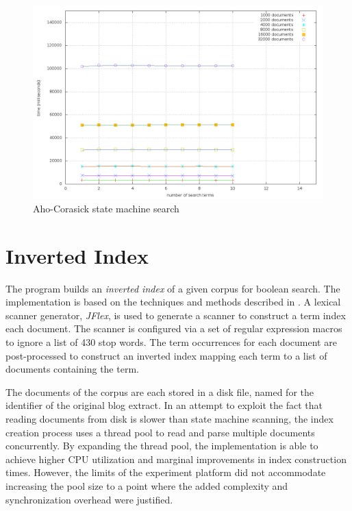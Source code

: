 \documentclass[10pt]{report}
\begin{document}
\begin{figure}
  \begin{center}
	\includegraphics[width=\textwidth,height=!]{ahosearch}
  \end{center}
  \caption{Aho-Corasick state machine search}
  \label{fig:ahosearch}
\end{figure} 

\section{Inverted Index}
The program builds an \textit{inverted index} of a given corpus for
boolean search. The implementation is based on the techniques and
methods described in \cite{RefWorks:109}. A lexical scanner generator,
\textit{JFlex}\cite{RefWorks:112}, is used to generate a scanner to
construct a term index each document. The scanner is configured via a
set of regular expression macros to ignore a list of 430 stop
words. The term occurrences for each document are post-processed to
construct an inverted index mapping each term to a list of documents
containing the term.

The documents of the corpus are each stored in a disk file, named for
the identifier of the original blog extract. In an attempt to exploit
the fact that reading documents from disk is slower than state machine
scanning, the index creation process uses a thread pool to read and
parse multiple documents concurrently. By expanding the thread pool,
the implementation is able to achieve higher CPU utilization and
marginal improvements in index construction times. However, the limits
of the experiment platform did not accommodate increasing the pool
size to a point where the added complexity and synchronization
overhead were justified.
\end{document}
